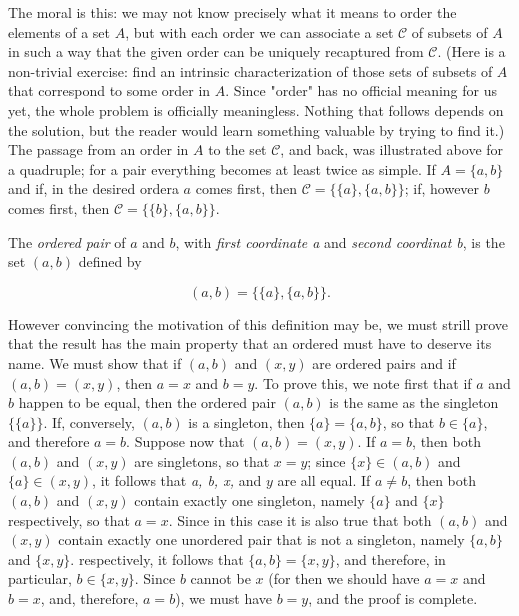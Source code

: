 The moral is this: we may not know precisely what it means to order the elements of a set $A$, but with each order we can associate a set $ \mathcal{C} $ of subsets of $A$ in such a way that the given order can be uniquely recaptured from $ \mathcal{C} $. (Here is a non-trivial exercise: find an intrinsic characterization of those sets of subsets of $A$ that correspond to some order in $A$. Since "order" has no official meaning for us yet, the whole problem is officially meaningless. Nothing that follows depends on the solution, but the reader would learn something valuable by trying to find it.) The passage from an order in $A$ to the set $ \mathcal{C} $, and back, was illustrated above for a quadruple; for a pair everything becomes at least twice as simple. If $ A = \{ a,b \}$ and if, in the desired ordera $a$ comes first, then $ \mathcal{C} = \{ \{ a \} , \{ a,b \} \}$; if, however $b$ comes first, then $ \mathcal{C} = \{ \{ b \}, \{a, b \}\}$. 

The \textit{ordered pair} of $a$ and $b$, with \textit{first coordinate a} and \textit{second coordinat b}, is the set $(a, b)$ defined by 

\begin{equation*}
(a, b) = \{ \{a \} , \{ a, b \} \}.
\end{equation*}

However convincing the motivation of this definition may be, we must strill prove that the result has the main property that an ordered must have to deserve its name. We must show that if $(a,b)$ and $(x, y)$ are ordered pairs and if $(a,b) = (x,y)$, then $ a = x $ and $b = y$. To prove this, we note first that if $a$ and $b$ happen to be equal, then the ordered pair $(a,b)$ is the same as the singleton $ \{ \{ a \} \} $. If, conversely, $(a,b)$ is a singleton, then $ \{ a \} =  \{ a , b \}$, so that $ b \in \{ a \} $, and therefore $a = b$. Suppose now that $ (a, b) = (x, y)$. If $ a = b $, then both $(a, b)$ and $(x,y)$ are singletons, so that $ x = y $; since $ \{ x \} \in (a,b)$ and $ \{ a \} \in (x,y)$, it follows that \textit{a, b, x,} and $y$ are all equal. If $a \neq b$, then both $(a, b)$ and $(x, y)$ contain exactly one singleton, namely $ \{a \}$ and $ \{ x \} $ respectively, so that $a = x$. Since in this case it is also true that both $(a,b)$ and $(x, y)$ contain exactly one unordered pair that is not a singleton, namely $ \{a, b \}$ and $ \{ x, y \}$. respectively, it follows that $ \{ a, b \} = \{ x,y \} $, and therefore, in particular, $b \in \{ x,y \} $. Since $b$ cannot be $x$ (for then we should have $ a = x $ and $ b = x $, and, therefore, $ a = b $), we must have $b = y $, and the proof is complete. 

